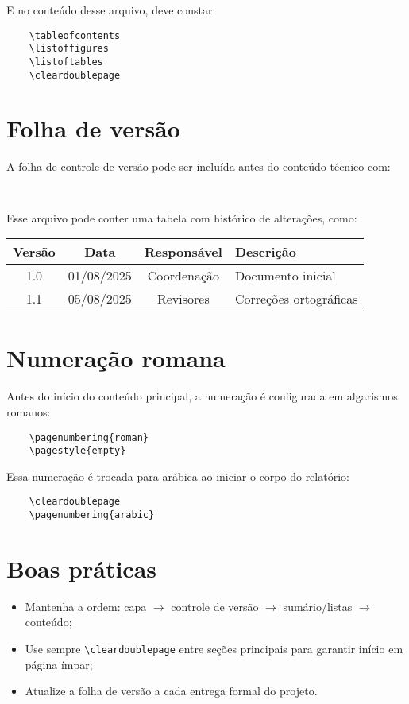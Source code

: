 E no conteúdo desse arquivo, deve constar:

\begin{verbatim}
	\tableofcontents
	\listoffigures
	\listoftables
	\cleardoublepage
\end{verbatim}

\section{Folha de versão}

A folha de controle de versão pode ser incluída antes do conteúdo técnico com:

\begin{verbatim}
	
\end{verbatim}

Esse arquivo pode conter uma tabela com histórico de alterações, como:

\begin{center}
	\begin{tabular}{|c|c|c|l|}
		\hline
		Versão & Data & Responsável & Descrição \\
		\hline
		1.0 & 01/08/2025 & Coordenação & Documento inicial \\
		1.1 & 05/08/2025 & Revisores & Correções ortográficas \\
		\hline
	\end{tabular}
\end{center}

\section{Numeração romana}

Antes do início do conteúdo principal, a numeração é configurada em algarismos romanos:

\begin{verbatim}
	\pagenumbering{roman}
	\pagestyle{empty}
\end{verbatim}

Essa numeração é trocada para arábica ao iniciar o corpo do relatório:

\begin{verbatim}
	\cleardoublepage
	\pagenumbering{arabic}
\end{verbatim}

\section{Boas práticas}

\begin{itemize}
	\item Mantenha a ordem: capa $\rightarrow$ controle de versão $\rightarrow$ sumário/listas $\rightarrow$ conteúdo;
	\item Use sempre \verb|\cleardoublepage| entre seções principais para garantir início em página ímpar;
	\item Atualize a folha de versão a cada entrega formal do projeto.
\end{itemize}
